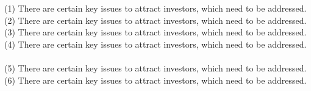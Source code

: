 \documentclass[11pt,a4paper]{article}
\begin{document}
(1) There are certain key issues to attract
investors, which need to be addressed.
\newline
(2) There are certain key issues to attract
investors, which need to be addressed.\linebreak
(3) There are certain key issues to attract
investors, which need to be addressed.\\
(4) There are certain key issues to attract
investors, which need to be addressed.\\\\
(5) There are certain key issues to attract
investors, which need to be addressed.
(6) There are certain key issues to attract
investors, which need to be addressed.
\end{document}
